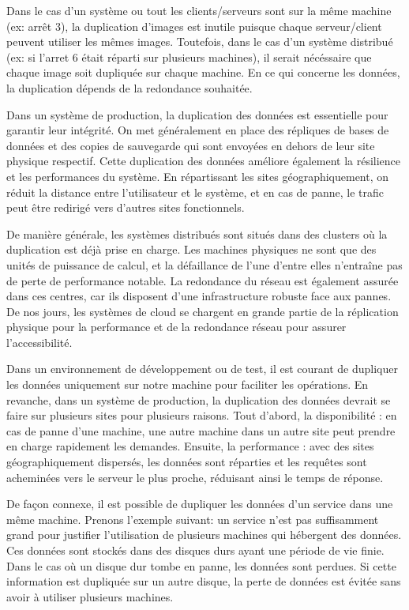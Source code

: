 \documentclass[a11paper, 11pt]{article}
\newcommand{\todo}[1]{\textcolor{orange}{\textbf{TODO}: #1}}
\begin{document}

Dans le cas d'un système ou tout les clients/serveurs sont sur la même machine
(ex: arrêt 3), la duplication d'images est inutile puisque chaque
serveur/client peuvent utiliser les mêmes images. Toutefois, dans le cas d'un
système distribué (ex: si l'arret 6 était réparti sur plusieurs machines), il
serait nécéssaire que chaque image soit dupliquée sur chaque machine. En ce qui
concerne les données, la duplication dépends de la redondance souhaitée.


Dans un système de production, la duplication des données est essentielle pour
garantir leur intégrité. On met généralement en place des répliques de bases de
données et des copies de sauvegarde qui sont envoyées en dehors de leur site
physique respectif. Cette duplication des données améliore également la
résilience et les performances du système. En répartissant les sites
géographiquement, on réduit la distance entre l'utilisateur et le système, et
en cas de panne, le trafic peut être redirigé vers d'autres sites fonctionnels.

De manière générale, les systèmes distribués sont situés dans des clusters où
la duplication est déjà prise en charge. Les machines physiques ne sont que des
unités de puissance de calcul, et la défaillance de l'une d'entre elles
n'entraîne pas de perte de performance notable. La redondance du réseau est
également assurée dans ces centres, car ils disposent d'une infrastructure
robuste face aux pannes. De nos jours, les systèmes de cloud se chargent en
grande partie de la réplication physique pour la performance et de la
redondance réseau pour assurer l'accessibilité.

Dans un environnement de développement ou de test, il est courant de dupliquer
les données uniquement sur notre machine pour faciliter les opérations. En
revanche, dans un système de production, la duplication des données devrait se
faire sur plusieurs sites pour plusieurs raisons. Tout d'abord, la
disponibilité : en cas de panne d'une machine, une autre machine dans un autre
site peut prendre en charge rapidement les demandes. Ensuite, la performance :
avec des sites géographiquement dispersés, les données sont réparties et les
requêtes sont acheminées vers le serveur le plus proche, réduisant ainsi le
temps de réponse.

De façon connexe, il est possible de dupliquer les données d'un service dans
une même machine. Prenons l'exemple suivant: un service n'est pas suffisamment
grand pour justifier l'utilisation de plusieurs machines qui hébergent des
données. Ces données sont stockés dans des disques durs ayant une période de
vie finie. Dans le cas où un disque dur tombe en panne, les données sont
perdues. Si cette information est dupliquée sur un autre disque, la perte de
données est évitée sans avoir à utiliser plusieurs machines.
\end{document}
